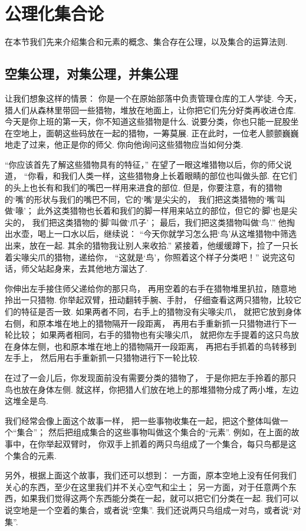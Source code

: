 \section{公理化集合论}
在本节我们先来介绍集合和元素的概念、集合存在公理，以及集合的运算法则.

\subsection{空集公理，对集公理，并集公理}
让我们想象这样的情景：
你是一个在原始部落中负责管理仓库的工人学徒.
今天，猎人们从森林里带回一些猎物，堆放在地面上，让你把它们先分好类再收进仓库.
今天是你上班的第一天，你不知道这些猎物是什么.
说要分类，你也只能一屁股坐在空地上，面朝这些码放在一起的猎物，一筹莫展.
正在此时，一位老人颤颤巍巍地走了过来，他正是你的师父.
你向他询问这些猎物应当如何分类.

“你应该首先了解这些猎物具有的特征，”
在望了一眼这堆猎物以后，你的师父说道，
“你看，和我们人类一样，这些猎物身上长着眼睛的部位也叫做头部.
在它们的头上也长有和我们的嘴巴一样用来进食的部位.
但是，你要注意，有的猎物的‘嘴’的形状与我们的嘴巴不同，它的‘嘴’是尖尖的，
我们把这类猎物的‘嘴’叫做‘喙’；
此外这类猎物也长着和我们的脚一样用来站立的部位，但它的‘脚’也是尖尖的，
我们把这类猎物的‘脚’叫做‘爪子’；
最后，我们把这类猎物叫做‘鸟’.”
他掏出水壶，喝上一口水以后，继续说：
“今天你就学习怎么把‘鸟’从这堆猎物中筛选出来，放在一起.
其余的猎物我让别人来收拾.”
紧接着，他缓缓蹲下，捡了一只长着尖喙尖爪的猎物，递给你，
“这就是‘鸟’，你照着这个样子分类吧！”
说完这句话，师父站起身来，去其他地方溜达了.

你伸出左手接住师父递给你的那只鸟，
再用空着的右手在猎物堆里扒拉，随意地拎出一只猎物.
你举起双臂，扭动翻转手腕、手肘，
仔细查看这两只猎物，比较它们的特征是否一致.
如果两者不同，右手上的猎物没有尖喙尖爪，
就把它放到身体右侧，和原本堆在地上的猎物隔开一段距离，
再用右手重新抓一只猎物进行下一轮比较；
如果两者相同，右手的猎物也有尖喙尖爪，
就把你左手提着的这只鸟放在身体左侧，也和原本堆在地上的猎物隔开一段距离，
再把右手抓着的鸟转移到左手上，
然后用右手重新抓一只猎物进行下一轮比较.

在过了一会儿后，你发现面前没有需要分类的猎物了，
于是你把左手拎着的那只鸟也放在身体左侧.
就这样，你把猎人们放在地上的那堆猎物分成了两小堆，左边这堆全是鸟.

我们经常会像上面这个故事一样，
把一些事物收集在一起，把这个整体叫做一个“集合”；
然后把组成集合的这些事物叫做这个集合的“元素”.
例如，在上面的故事中，在你举起双臂时，
你双手上抓着的两只鸟组成了一个集合，每只鸟都是这个集合的元素.

另外，根据上面这个故事，我们还可以想到：
一方面，原本空地上没有任何我们关心的东西，至少在这里我们并不关心空气和尘土；
另一方面，对于任意两个东西，如果我们觉得这两个东西能分类在一起，就可以把它们分类在一起.
我们可以说空地是一个空着的集合，或者说“空集”.
我们还说两只鸟组成一对鸟，或者说“对集”.

